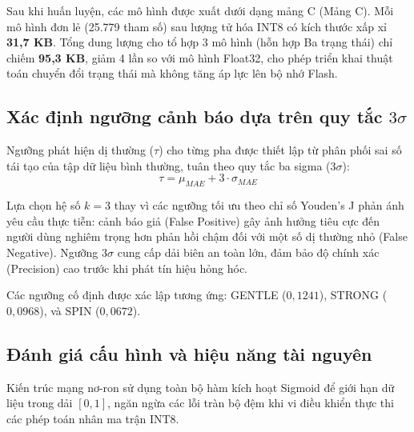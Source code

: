 Sau khi huấn luyện, các mô hình được xuất dưới dạng mảng C (Mảng C). Mỗi mô hình đơn lẻ (25.779 tham số) sau lượng tử hóa INT8 có kích thước xấp xỉ \textbf{31,7 KB}. Tổng dung lượng cho tổ hợp 3 mô hình (hỗn hợp Ba trạng thái) chỉ chiếm \textbf{95,3 KB}, giảm 4 lần so với mô hình Float32, cho phép triển khai thuật toán chuyển đổi trạng thái mà không tăng áp lực lên bộ nhớ Flash.

\subsection{Xác định ngưỡng cảnh báo dựa trên quy tắc $3\sigma$}
Ngưỡng phát hiện dị thường ($\tau$) cho từng pha được thiết lập từ phân phối sai số tái tạo của tập dữ liệu bình thường, tuân theo quy tắc ba sigma ($3\sigma$):
\begin{equation}
    \tau = \mu_{MAE} + 3 \cdot \sigma_{MAE}
\end{equation}

Lựa chọn hệ số $k=3$ thay vì các ngưỡng tối ưu theo chỉ số Youden's J phản ánh yêu cầu thực tiễn: cảnh báo giả (False Positive) gây ảnh hưởng tiêu cực đến người dùng nghiêm trọng hơn phản hồi chậm đối với một số dị thường nhỏ (False Negative). Ngưỡng $3\sigma$ cung cấp dải biên an toàn lớn, đảm bảo độ chính xác (Precision) cao trước khi phát tín hiệu hỏng hóc.

Các ngưỡng cố định được xác lập tương ứng: GENTLE ($0{,}1241$), STRONG ($0{,}0968$), và SPIN ($0{,}0672$).




\subsection{Đánh giá cấu hình và hiệu năng tài nguyên}

Kiến trúc mạng nơ-ron sử dụng toàn bộ hàm kích hoạt Sigmoid để giới hạn dữ liệu trong dải $[0, 1]$, ngăn ngừa các lỗi tràn bộ đệm khi vi điều khiển thực thi các phép toán nhân ma trận INT8.

